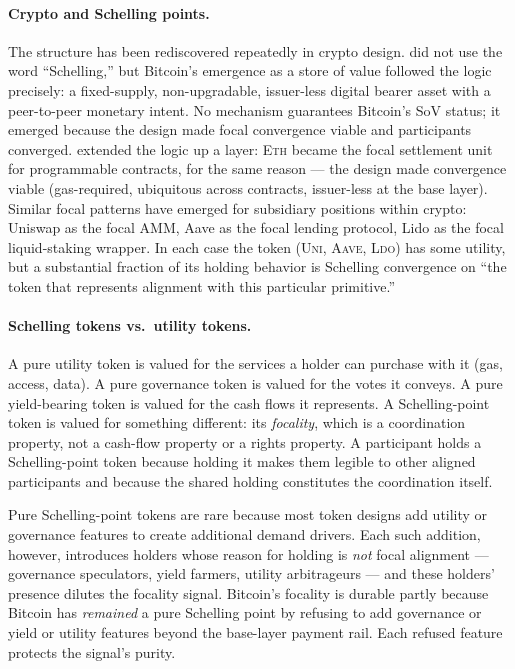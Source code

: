 \documentclass[11pt,a4paper]{article}
\theoremstyle{definition}
\theoremstyle{remark}
\begin{document}
\paragraph{Crypto and Schelling points.}
The structure has been rediscovered repeatedly in crypto design.
\citet{nakamoto2008bitcoin} did not use the word ``Schelling,''
but Bitcoin's emergence as a store of value followed the logic
precisely: a fixed-supply, non-upgradable, issuer-less digital
bearer asset with a peer-to-peer monetary intent. No mechanism
guarantees Bitcoin's SoV status; it emerged because the design
made focal convergence viable and participants converged.
\citet{buterin2014ethereum} extended the logic up a layer:
\textsc{Eth} became the focal settlement unit for programmable
contracts, for the same reason --- the design made convergence
viable (gas-required, ubiquitous across contracts, issuer-less at
the base layer). Similar focal patterns have emerged for
subsidiary positions within crypto: Uniswap as the focal AMM,
Aave as the focal lending protocol, Lido as the focal liquid-staking
wrapper. In each case the token (\textsc{Uni},
\textsc{Aave}, \textsc{Ldo}) has some utility, but a substantial
fraction of its holding behavior is Schelling convergence on
``the token that represents alignment with this particular
primitive.''

\paragraph{Schelling tokens vs.\ utility tokens.}
A pure utility token is valued for the services a holder can
purchase with it (gas, access, data). A pure governance token is
valued for the votes it conveys. A pure yield-bearing token is
valued for the cash flows it represents. A Schelling-point token
is valued for something different: its \emph{focality}, which is
a coordination property, not a cash-flow property or a rights
property. A participant holds a Schelling-point token because
holding it makes them legible to other aligned participants and
because the shared holding constitutes the coordination itself.

Pure Schelling-point tokens are rare because most token designs
add utility or governance features to create additional demand
drivers. Each such addition, however, introduces holders whose
reason for holding is \emph{not} focal alignment --- governance
speculators, yield farmers, utility arbitrageurs --- and these
holders' presence dilutes the focality signal. Bitcoin's focality
is durable partly because Bitcoin has \emph{remained} a pure
Schelling point by refusing to add governance or yield or utility
features beyond the base-layer payment rail. Each refused feature
protects the signal's purity.
\end{document}
